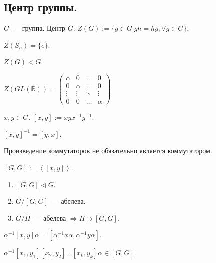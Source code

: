 \documentclass[12pt]{article}
\begin{document}
	\subsection{Центр группы.}
	\begin{definition}
		$G$~--- группа. Центр $G$: $Z(G) := \{ g \in G | gh = hg, \forall g \in G \}$.
	\end{definition}
	\begin{statement}
		$Z(S_n) = \{ e \}$.
	\end{statement}
	\begin{theorem}
		$Z(G) \vartriangleleft G$.
	\end{theorem}
	\begin{statement}
		$Z(GL(\mathbb{R})) = \begin{pmatrix}
			\alpha & 0 & \dots & 0\\
			0 & \alpha & \dots & 0\\
			\vdots & \vdots & \ddots & \vdots\\
			0 & 0 & \dots & \alpha
		\end{pmatrix}$
	\end{statement}
	\begin{definition}[Коммутатор]
		$x, y \in G$. $[x, y] := xyx^{-1}y^{-1}$.
	\end{definition}
	\begin{statement}
		$[x, y]^{-1} = [y, x]$.
	\end{statement}
	\begin{note}
		Произведение коммутаторов не обязательно является коммутатором.
	\end{note}
	\begin{definition}[Коммутант]
		$[G, G] := \left< [x, y] \right>$.
	\end{definition}
	\begin{theorem}
		\begin{enumerate}
			\item $[G, G] \vartriangleleft G$.
			\item $G / [G; G]$~--- абелева.
			\item $G / H$~--- абелева $\Rightarrow H \supset [G, G]$.
		\end{enumerate}
	\end{theorem}
	\begin{statement}
		$\alpha^{-1} [x, y] \alpha = [\alpha^{-1} x \alpha, \alpha^{-1} y \alpha]$.
	\end{statement}
	\begin{statement}
		$\alpha^{-1} [x_1, y_1] [x_2, y_2] \dots [x_k, y_k] \alpha \in [G, G]$.
	\end{statement}
\end{document}
